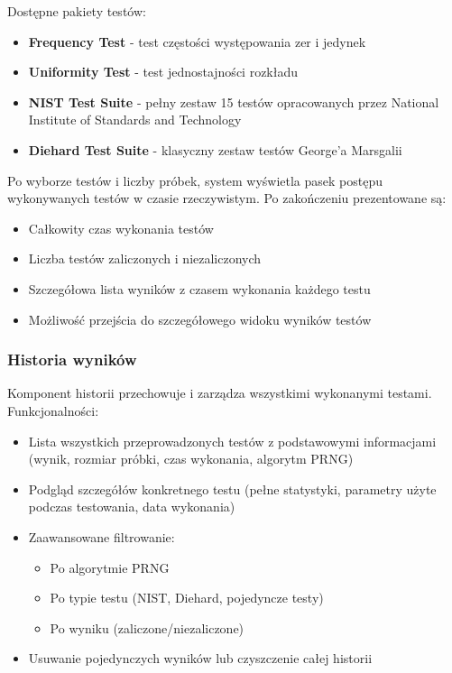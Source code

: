 \documentclass[12pt,a4paper]{article}
\begin{document}
Dostępne pakiety testów:
\begin{itemize}
    \item \textbf{Frequency Test} - test częstości występowania zer i jedynek
    \item \textbf{Uniformity Test} - test jednostajności rozkładu
    \item \textbf{NIST Test Suite} - pełny zestaw 15 testów opracowanych przez National Institute of Standards and Technology
    \item \textbf{Diehard Test Suite} - klasyczny zestaw testów George'a Marsgalii
\end{itemize}

Po wyborze testów i liczby próbek, system wyświetla pasek postępu wykonywanych testów w czasie rzeczywistym. Po zakończeniu prezentowane są:
\begin{itemize}
    \item Całkowity czas wykonania testów
    \item Liczba testów zaliczonych i niezaliczonych
    \item Szczegółowa lista wyników z czasem wykonania każdego testu
    \item Możliwość przejścia do szczegółowego widoku wyników testów
\end{itemize}

\subsubsection{Historia wyników}

Komponent historii przechowuje i zarządza wszystkimi wykonanymi testami. Funkcjonalności:
\begin{itemize}
    \item Lista wszystkich przeprowadzonych testów z podstawowymi informacjami (wynik, rozmiar próbki, czas wykonania, algorytm PRNG)
    \item Podgląd szczegółów konkretnego testu (pełne statystyki, parametry użyte podczas testowania, data wykonania)
    \item Zaawansowane filtrowanie:
    \begin{itemize}
        \item Po algorytmie PRNG
        \item Po typie testu (NIST, Diehard, pojedyncze testy)
        \item Po wyniku (zaliczone/niezaliczone)
    \end{itemize}
    \item Usuwanie pojedynczych wyników lub czyszczenie całej historii
\end{itemize}
\end{document}
